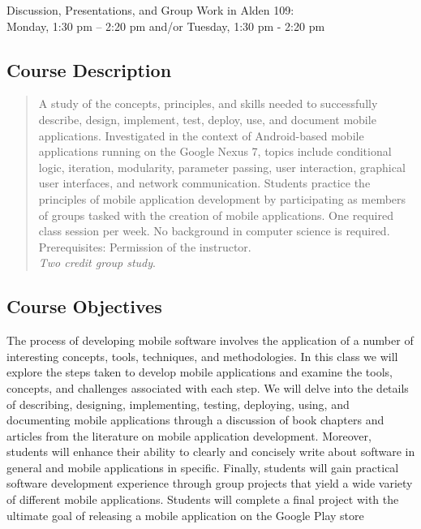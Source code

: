 Discussion, Presentations, and Group Work in Alden 109: \\ Monday, 1:30 pm -- 2:20 pm and/or Tuesday, 1:30 pm - 2:20 pm 

\subsection*{Course Description}

\begin{quote}

	A study of the concepts, principles, and skills needed to successfully describe, design, implement, test, deploy,
	use, and document mobile applications.  Investigated in the context of Android-based mobile applications running on
	the Google Nexus 7, topics include conditional logic, iteration, modularity, parameter passing, user interaction,
	graphical user interfaces, and network communication. Students practice the principles of mobile application
	development by participating as members of groups tasked with the creation of mobile applications.  One required
	class session per week. No background in computer science is required. Prerequisites: Permission of the instructor.
	\\ {\em Two credit group study}.
	
\end{quote}

\subsection*{Course Objectives}

The process of developing mobile software involves the application of a number of interesting concepts, tools,
techniques, and methodologies.  In this class we will explore the steps taken to develop mobile applications and examine
the tools, concepts, and challenges associated with each step.  We will delve into the details of describing, designing,
implementing, testing, deploying, using, and documenting mobile applications through a discussion of book chapters and
articles from the literature on mobile application development.  Moreover, students will enhance their ability to
clearly and concisely write about software in general and mobile applications in specific.  Finally, students will gain
practical software development experience through group projects that yield a wide variety of different mobile
applications. Students will complete a final project with the ultimate goal of releasing a mobile application on the
Google Play store

